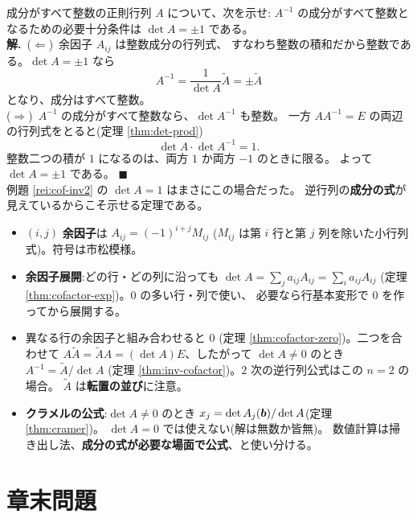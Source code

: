\begin{rei}[例題・標準(証明:整数行列の逆行列)]\label{rei:cof-intinv}
成分がすべて整数の正則行列 $A$ について、次を示せ:
$A^{-1}$ の成分がすべて整数となるための必要十分条件は
$\det A = \pm 1$ である。\\
\textbf{解.}\ ($\Leftarrow$)\ 余因子 $A_{ij}$ は整数成分の行列式、
すなわち整数の積和だから整数である。$\det A = \pm 1$ なら
\[
A^{-1} = \frac{1}{\det A}\widetilde{A} = \pm \widetilde{A}
\]
となり、成分はすべて整数。\\
($\Rightarrow$)\ $A^{-1}$ の成分がすべて整数なら、$\det A^{-1}$ も整数。
一方 $AA^{-1} = E$ の両辺の行列式をとると(定理 \ref{thm:det-prod})
\[
\det A \cdot \det A^{-1} = 1.
\]
整数二つの積が $1$ になるのは、両方 $1$ か両方 $-1$ のときに限る。
よって $\det A = \pm 1$ である。 $\blacksquare$\\
例題 \ref{rei:cof-inv2} の $\det A = 1$ はまさにこの場合だった。
逆行列の\textbf{成分の式}が見えているからこそ示せる定理である。
\end{rei}

\begin{matome}
\begin{itemize}
\item $(i,j)$ \textbf{余因子}は $A_{ij} = (-1)^{i+j} M_{ij}$
($M_{ij}$ は第 $i$ 行と第 $j$ 列を除いた小行列式)。符号は市松模様。
\item \textbf{余因子展開}:どの行・どの列に沿っても
$\det A = \sum_j a_{ij}A_{ij} = \sum_i a_{ij}A_{ij}$
(定理 \ref{thm:cofactor-exp})。$0$ の多い行・列で使い、
必要なら行基本変形で $0$ を作ってから展開する。
\item 異なる行の余因子と組み合わせると $0$
(定理 \ref{thm:cofactor-zero})。二つを合わせて
$A\widetilde{A} = \widetilde{A}A = (\det A)E$、したがって
$\det A \neq 0$ のとき $A^{-1} = \widetilde{A}/\det A$
(定理 \ref{thm:inv-cofactor})。$2$ 次の逆行列公式はこの $n = 2$ の場合。
$\widetilde{A}$ は\textbf{転置の並び}に注意。
\item \textbf{クラメルの公式}:$\det A \neq 0$ のとき
$x_j = \det A_j(\bm{b}) / \det A$(定理 \ref{thm:cramer})。
$\det A = 0$ では使えない(解は無数か皆無)。
数値計算は掃き出し法、\textbf{成分の式が必要な場面で公式}、と使い分ける。
\end{itemize}
\end{matome}

\section*{章末問題}

